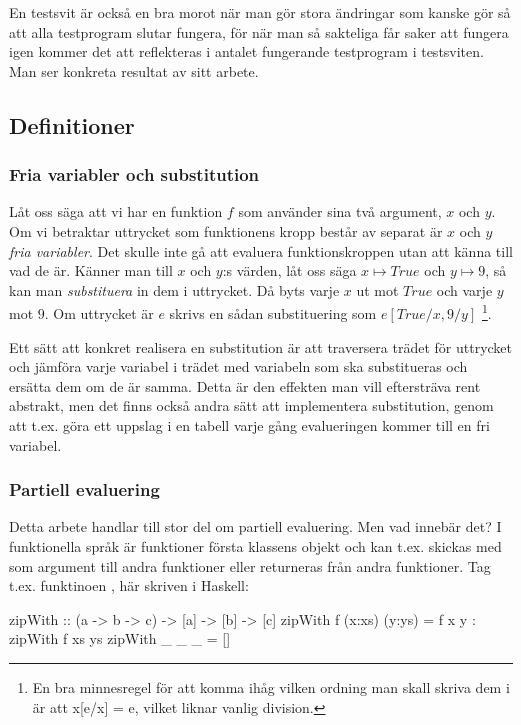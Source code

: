 \documentclass[Rapport]{subfiles}
\begin{document}
En testsvit är också en bra morot när man gör stora ändringar som kanske gör så att
alla testprogram slutar fungera, för när man så sakteliga får saker att fungera
igen kommer det att reflekteras i antalet fungerande testprogram i testsviten. 
Man ser konkreta resultat av sitt arbete.



\subsection{Definitioner}

\subsubsection{Fria variabler och substitution}
Låt oss säga att vi har en funktion $f$ som använder sina två 
argument, $x$ och $y$. Om vi betraktar uttrycket som funktionens 
kropp består av separat är $x$ och $y$ 
\emph{fria variabler}. Det skulle inte gå att evaluera funktionskroppen utan
att känna till vad de är. Känner man till $x$ och $y$:s värden, låt oss säga
$x \mapsto True$ och $y \mapsto 9$, så kan man \emph{substituera} in dem i uttrycket. Då byts varje
$x$ ut mot $True$ och varje $y$ mot $9$. Om uttrycket är $e$ skrivs en sådan substituering som $e[True/x, 9/y]$
\footnote{En bra minnesregel för att komma ihåg vilken ordning man skall skriva dem i är att x[e/x] = e, vilket liknar vanlig division.}. 

    Ett sätt att konkret realisera en substitution är att traversera trädet
för uttrycket och jämföra varje variabel i trädet med variabeln som ska substitueras och ersätta dem
om de är samma. Detta är den effekten man vill eftersträva rent abstrakt,
men det finns också andra sätt att implementera substitution, genom
att t.ex. göra ett uppslag i en tabell varje gång evalueringen kommer till en fri variabel. 

\subsubsection{Partiell evaluering}
Detta arbete handlar till stor del om partiell evaluering. Men vad innebär det?
I funktionella språk är funktioner första klassens objekt och kan t.ex.
skickas med som argument till andra funktioner eller returneras från
andra funktioner. Tag t.ex. funktinoen , här skriven i Haskell:

\begin{codeEx}
zipWith :: (a -> b -> c) -> [a] -> [b] -> [c]
zipWith f (x:xs) (y:ys) = f x y : zipWith f xs ys
zipWith _ _      _      = []
\end{codeEx}
\end{document}
